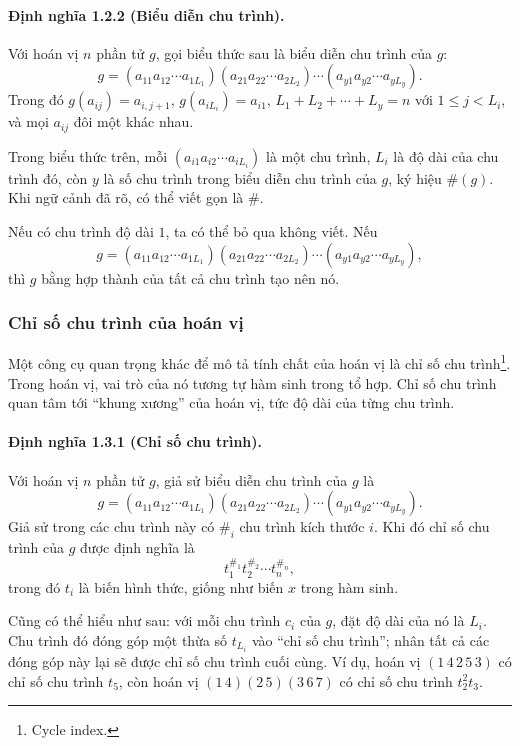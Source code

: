 \documentclass[11pt]{article}
\begin{document}
\paragraph{Định nghĩa 1.2.2 (Biểu diễn chu trình).}
Với hoán vị \(n\) phần tử \(g\), gọi biểu thức sau là biểu diễn chu trình của
\(g\):
\[
  g=(a_{11}a_{12}\cdots a_{1L_1})
    (a_{21}a_{22}\cdots a_{2L_2})\cdots
    (a_{y1}a_{y2}\cdots a_{yL_y}).
\]
Trong đó \(g(a_{ij})=a_{i,j+1}\), \(g(a_{iL_i})=a_{i1}\),
\(L_1+L_2+\cdots+L_y=n\) với \(1\le j<L_i\), và mọi \(a_{ij}\) đôi một khác
nhau.

Trong biểu thức trên, mỗi \((a_{i1}a_{i2}\cdots a_{iL_i})\) là một chu trình,
\(L_i\) là độ dài của chu trình đó, còn \(y\) là số chu trình trong biểu diễn
chu trình của \(g\), ký hiệu \(\#(g)\). Khi ngữ cảnh đã rõ, có thể viết gọn là
\(\#\).

Nếu có chu trình độ dài \(1\), ta có thể bỏ qua không viết. Nếu
\[
  g=(a_{11}a_{12}\cdots a_{1L_1})
    (a_{21}a_{22}\cdots a_{2L_2})\cdots
    (a_{y1}a_{y2}\cdots a_{yL_y}),
\]
thì \(g\) bằng hợp thành của tất cả chu trình tạo nên nó.

\subsubsection{Chỉ số chu trình của hoán vị}

Một công cụ quan trọng khác để mô tả tính chất của hoán vị là chỉ số chu
trình\footnote{Cycle index.}. Trong hoán vị, vai trò của nó tương tự hàm sinh
trong tổ hợp. Chỉ số chu trình quan tâm tới ``khung xương'' của hoán vị, tức
độ dài của từng chu trình.

\paragraph{Định nghĩa 1.3.1 (Chỉ số chu trình).}
Với hoán vị \(n\) phần tử \(g\), giả sử biểu diễn chu trình của \(g\) là
\[
  g=(a_{11}a_{12}\cdots a_{1L_1})
    (a_{21}a_{22}\cdots a_{2L_2})\cdots
    (a_{y1}a_{y2}\cdots a_{yL_y}).
\]
Giả sử trong các chu trình này có \(\#_i\) chu trình kích thước \(i\). Khi đó
chỉ số chu trình của \(g\) được định nghĩa là
\[
  t_1^{\#_1}t_2^{\#_2}\cdots t_n^{\#_n},
\]
trong đó \(t_i\) là biến hình thức, giống như biến \(x\) trong hàm sinh.

Cũng có thể hiểu như sau: với mỗi chu trình \(c_i\) của \(g\), đặt độ dài của
nó là \(L_i\). Chu trình đó đóng góp một thừa số \(t_{L_i}\) vào ``chỉ số chu
trình''; nhân tất cả các đóng góp này lại sẽ được chỉ số chu trình cuối cùng.
Ví dụ, hoán vị \((1\,4\,2\,5\,3)\) có chỉ số chu trình \(t_5\), còn hoán vị
\((1\,4)(2\,5)(3\,6\,7)\) có chỉ số chu trình \(t_2^2t_3\).
\end{document}
